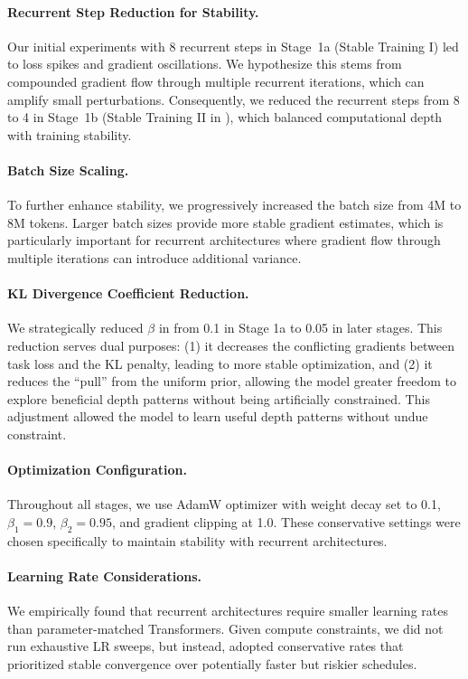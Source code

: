 \documentclass[]{bytedance_seed}
\newcommand{\1}{\mathbf{1}}
\begin{document}
\paragraph{Recurrent Step Reduction for Stability.} Our initial experiments with 8 recurrent steps in Stage~1a (Stable Training I) led to loss spikes and gradient oscillations. We hypothesize this stems from compounded gradient flow through multiple recurrent iterations, which can amplify small perturbations. Consequently, we reduced the recurrent steps from 8 to 4 in Stage~1b (Stable Training II in ), which balanced computational depth with training stability.

\paragraph{Batch Size Scaling.} To further enhance stability, we progressively increased the batch size from 4M to 8M tokens. Larger batch sizes provide more stable gradient estimates, which is particularly important for recurrent architectures where gradient flow through multiple iterations can introduce additional variance.

\paragraph{KL Divergence Coefficient Reduction.} We strategically reduced $\beta$ in  from 0.1 in Stage 1a to 0.05 in later stages. This reduction serves dual purposes: (1) it decreases the conflicting gradients between task loss and the KL penalty, leading to more stable optimization, and (2) it reduces the ``pull'' from the uniform prior, allowing the model greater freedom to explore beneficial depth patterns without being artificially constrained. This adjustment allowed the model to learn useful depth patterns without undue constraint.


\paragraph{Optimization Configuration.} 
Throughout all stages, we use AdamW optimizer with weight decay set to 0.1, $\beta_1 = 0.9$, $\beta_2 = 0.95$, and gradient clipping at 1.0. These conservative settings were chosen specifically to maintain stability with recurrent architectures.

\paragraph{Learning Rate Considerations.} 
We empirically found that recurrent architectures require smaller learning rates than parameter-matched Transformers. Given compute constraints, we did not run exhaustive LR sweeps, but instead, adopted conservative rates that prioritized stable convergence over potentially faster but riskier schedules.
\end{document}
